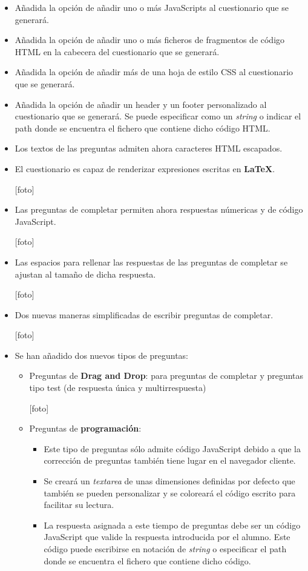 \begin{itemize}
  \item A\~{n}adida la opci\'on de a\~{n}adir uno o m\'as JavaScripts al cuestionario que se generar\'a.
  \item A\~{n}adida la opci\'on de a\~{n}adir uno o m\'as ficheros de fragmentos de c\'odigo HTML en la cabecera 
  del cuestionario que se generar\'a.
  \item A\~{n}adida la opci\'on de a\~{n}adir m\'as de una hoja de estilo CSS al cuestionario que se generar\'a.
  \item A\~{n}adida la opci\'on de a\~{n}adir un header y un footer personalizado al cuestionario que se generar\'a.
  Se puede especificar como un \textit{string} o indicar el path donde se encuentra el fichero que contiene 
  dicho c\'odigo HTML.
  \item Los textos de las preguntas admiten ahora caracteres HTML escapados.
  \item El cuestionario es capaz de renderizar expresiones escritas en {\bfseries LaTeX}.
  
  [foto]
  
  \item Las preguntas de completar permiten ahora respuestas n\'umericas y de c\'odigo JavaScript.
  
  [foto]
  
  \item Las espacios para rellenar las respuestas de las preguntas de completar se ajustan al tama\~{n}o de dicha respuesta.
  
  [foto]
  
  \item Dos nuevas maneras simplificadas de escribir preguntas de completar.
  
  [foto]
  
  \item Se han a\~{n}adido dos nuevos tipos de preguntas:
  \begin{itemize}
    \item Preguntas de {\bfseries Drag and Drop}: para preguntas de completar y preguntas tipo test (de respuesta \'unica
    y multirrespuesta)
    
    [foto]
    \bigskip
    
    \item Preguntas de {\bfseries programaci\'on}:
    \begin{itemize}
      \item Este tipo de preguntas s\'olo admite c\'odigo JavaScript debido a que la correcci\'on de preguntas tambi\'en 
      tiene lugar en el navegador cliente.
      \item Se crear\'a un \textit{textarea} de unas dimensiones definidas por defecto que tambi\'en se pueden personalizar
      y se colorear\'a el c\'odigo escrito para facilitar su lectura.
      \item La respuesta asignada a este tiempo de preguntas debe ser un c\'odigo JavaScript que valide la respuesta introducida
      por el alumno. Este c\'odigo puede escribirse en notaci\'on de \textit{string} o especificar el path donde se encuentra el
      fichero que contiene dicho c\'odigo.
      

\end{itemize}
\end{itemize}
\end{itemize}
